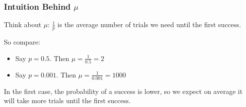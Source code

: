 \documentclass[slides]{beamer}
\newcommand{\blue}[1]{\textcolor{blue2}{#1}}
\begin{document}
\begin{frame}[fragile]
\frametitle{Intuition Behind $\mu$}

Think about $\mu$:  $\frac{1}{p}$ is the average number of trials we need until the \blue{first} success.

\vspace{0.5cm}

\pause So compare:
\begin{itemize}
\item Say $p=0.5$.  Then $\mu = \frac{1}{0.5} = 2$
\item Say $p=0.001$.  Then $\mu = \frac{1}{0.001} = 1000$
\end{itemize}

\vspace{0.5cm}

\pause In the first case, the probability of a success is \blue{lower}, so we expect on average it will take more trials until the \blue{first} success.  

\end{frame}
\end{document}
